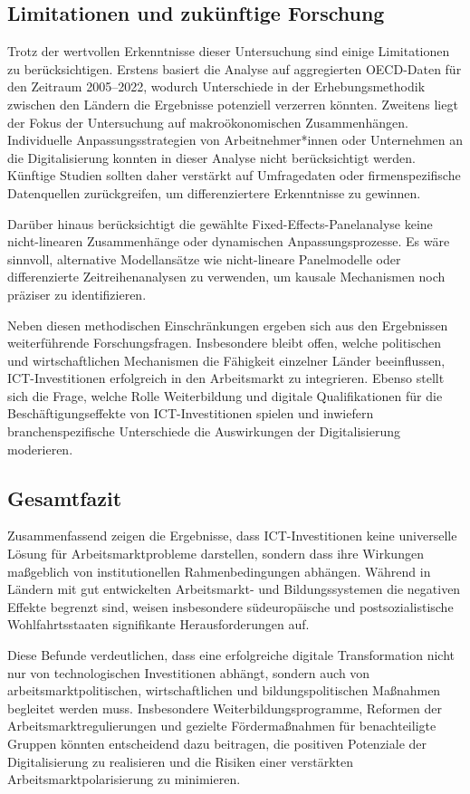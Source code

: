 \subsection{Limitationen und zukünftige Forschung}

Trotz der wertvollen Erkenntnisse dieser Untersuchung sind einige Limitationen zu 
berücksichtigen. Erstens basiert die Analyse auf aggregierten \ac{OECD}-Daten für den 
Zeitraum 2005–2022, wodurch Unterschiede in der Erhebungsmethodik zwischen den 
Ländern die Ergebnisse potenziell verzerren könnten. Zweitens liegt der Fokus der 
Untersuchung auf makroökonomischen Zusammenhängen. Individuelle Anpassungsstrategien 
von Arbeitnehmer*innen oder Unternehmen an die Digitalisierung konnten in dieser 
Analyse nicht berücksichtigt werden. Künftige Studien sollten daher verstärkt auf 
Umfragedaten oder firmenspezifische Datenquellen zurückgreifen, um differenziertere 
Erkenntnisse zu gewinnen.

Darüber hinaus berücksichtigt die gewählte Fixed-Effects-Panelanalyse keine nicht-linearen 
Zusammenhänge oder dynamischen Anpassungsprozesse. Es wäre sinnvoll, alternative 
Modellansätze wie nicht-lineare Panelmodelle oder differenzierte Zeitreihenanalysen 
zu verwenden, um kausale Mechanismen noch präziser zu identifizieren.

Neben diesen methodischen Einschränkungen ergeben sich aus den Ergebnissen weiterführende 
Forschungsfragen. Insbesondere bleibt offen, welche politischen und wirtschaftlichen 
Mechanismen die Fähigkeit einzelner Länder beeinflussen, ICT-Investitionen erfolgreich in 
den Arbeitsmarkt zu integrieren. Ebenso stellt sich die Frage, welche Rolle Weiterbildung 
und digitale Qualifikationen für die Beschäftigungseffekte von ICT-Investitionen spielen 
und inwiefern branchenspezifische Unterschiede die Auswirkungen der Digitalisierung moderieren.

\subsection{Gesamtfazit}

Zusammenfassend zeigen die Ergebnisse, dass \ac{ICT}-Investitionen keine universelle 
Lösung für Arbeitsmarktprobleme darstellen, sondern dass ihre Wirkungen maßgeblich von 
institutionellen Rahmenbedingungen abhängen. Während in Ländern mit gut entwickelten 
Arbeitsmarkt- und Bildungssystemen die negativen Effekte begrenzt sind, weisen insbesondere 
südeuropäische und postsozialistische Wohlfahrtsstaaten signifikante Herausforderungen auf.

Diese Befunde verdeutlichen, dass eine erfolgreiche digitale Transformation nicht nur von 
technologischen Investitionen abhängt, sondern auch von arbeitsmarktpolitischen, 
wirtschaftlichen und bildungspolitischen Maßnahmen begleitet werden muss. Insbesondere 
Weiterbildungsprogramme, Reformen der Arbeitsmarktregulierungen und gezielte Fördermaßnahmen 
für benachteiligte Gruppen könnten entscheidend dazu beitragen, die positiven Potenziale 
der Digitalisierung zu realisieren und die Risiken einer verstärkten Arbeitsmarktpolarisierung 
zu minimieren.
